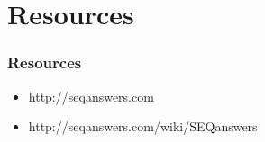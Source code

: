 \documentclass[pdf]{beamer}
\begin{document}
%
%
%

\section{Resources}
\begin{frame}
\frametitle{Resources}
\begin{itemize}
\item http://seqanswers.com
\item http://seqanswers.com/wiki/SEQanswers
\end{itemize}
\end{frame}
\end{document}
